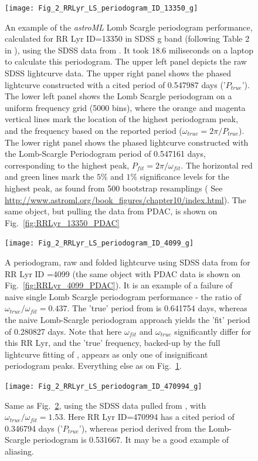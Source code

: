 \documentclass[fleqn,usenatbib]{mnras} %
\begin{document}
\begin{figure}
\texttt{[image: Fig\_2\_RRLyr\_LS\_periodogram\_ID\_13350\_g]}
\caption{ An example of the  {\it astroML} Lomb Scargle periodogram performance,  calculated for RR Lyr ID=13350  in SDSS g band (following Table 2 in \citep{sesar2010}), using the SDSS data from \citep{sesar2010}.  It took 18.6 miliseconds on a laptop to calculate this periodogram. The upper left panel depicts the raw  SDSS lightcurve data. The upper right panel shows the phased lightcurve constructed with a cited period of 0.547987 days ('$P_{true}$'). The lower left panel shows the Lomb Scargle periodogram on  a uniform frequency grid (5000 bins), where the orange and magenta vertical lines mark the location of the highest periodogram peak, and the frequency based on the reported period ($\omega_{true} = 2 \pi / P_{true}$). The lower right panel shows the phased lightcurve constructed with the Lomb-Scargle Periodogram period of 0.547161 days,  corresponding to the highest peak, $P_{fit} = 2 \pi / \omega_{fit}$. The horizontal red and green lines mark the $5\%$ and $1\%$  significance levels for the highest peak, as found from 500 bootstrap resamplings ( See \url{http://www.astroml.org/book\_figures/chapter10/index.html}). The same object, but pulling the data from PDAC, is shown on Fig.~\ref{fig:RRLyr_13350_PDAC} }
\label{fig:RRLyr_13350_Sesar}
\end{figure}



\begin{figure}
\texttt{[image: Fig\_2\_RRLyr\_LS\_periodogram\_ID\_4099\_g]}
\caption{A periodogram, raw and folded lightcurve using SDSS data from \citep{sesar2010}  for RR Lyr ID =4099 (the same object with PDAC data is shown on Fig.~\ref{fig:RRLyr_4099_PDAC}). It is an example of a failure of naive single Lomb Scargle periodogram performance -  the ratio of $\omega_{true} / \omega_{fit} = 0.437$.  The 'true' period from \citep{sesar2010} is  0.641754 days, whereas the naive Lomb-Scargle periodogram approach yields the 'fit' period of 0.280827  days.  Note that here $\omega_{fit}$ and $\omega_{true}$ significantly differ for this RR Lyr,  and the 'true' frequency, backed-up by the full lightcurve fitting of \citep{sesar2010}, appears as only one of insignificant periodogram peaks. Everything else as on Fig.~\ref{fig:RRLyr_13350_Sesar}.}
\label{fig:RRLyr_4099_Sesar}
\end{figure}


\begin{figure}
\texttt{[image: Fig\_2\_RRLyr\_LS\_periodogram\_ID\_470994\_g]}
\caption{Same as Fig.~\ref{fig:RRLyr_4099_Sesar}, using the SDSS data pulled  from \citep{sesar2010}, with $\omega_{true} / \omega_{fit} = 1.53$. Here  RR Lyr ID=470994 has a cited period of 0.346794  days ('$P_{true}$'), whereas period derived from the Lomb-Scargle periodogram is 0.531667. It may be a  good example of aliasing. }
\label{fig:RRLyr_470994_Sesar}
\end{figure}
\end{document}
